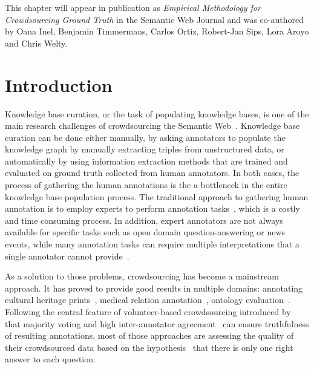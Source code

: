 
This chapter will appear in publication as \textit{Empirical Methodology for Crowdsourcing Ground Truth} in the Semantic Web Journal and was co-authored by Oana Inel, Benjamin Timmermans, Carlos Ortiz, Robert-Jan Sips, Lora Aroyo and Chris Welty.~\cite{dumitracheempirical}

\section{Introduction}
\label{sec:introduction}

Knowledge base curation, or the task of populating knowledge bases, is one of the main research challenges of crowdsourcing the Semantic Web~\cite{sarasua2015crowdsourcing}. Knowledge base curation can be done either manually, by asking annotators to populate the knowledge graph by manually extracting triples from unstructured data, or automatically by using information extraction methods that are trained and evaluated on ground truth collected from human annotators. In both cases, the process of gathering the human annotations is the a bottleneck in the entire knowledge base population process. The traditional approach to gathering human annotation is to employ experts to perform annotation tasks~\cite{welty2012query}, which is a costly and time consuming process. In addition, expert annotators are not always available for specific tasks such as open domain question-answering or news events, while many annotation tasks can require multiple interpretations that a single annotator cannot provide~\cite{aroyo2012harnessing}.

As a solution to those problems, crowdsourcing has become a mainstream approach. It has proved to provide good results in multiple domains: annotating cultural heritage prints~\cite{oosterman2014crowdsourcing}, medical relation annotation~\cite{aroyo2013measuring}, ontology evaluation~\cite{noy2013mechanical}. Following the central feature of volunteer-based crowdsourcing introduced by~\cite{von2009human} that majority voting and high inter-annotator agreement~\cite{Carletta1996} can ensure truthfulness of resulting annotations, most of those approaches are assessing the quality of their crowdsourced data based on the hypothesis~\cite{nowak2010reliable} that there is only one right answer to each question.

